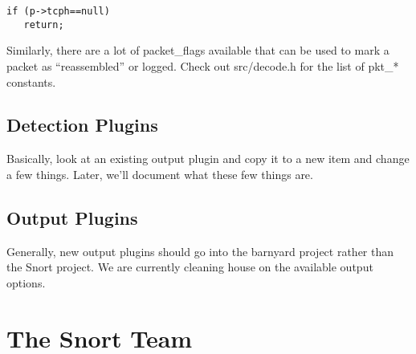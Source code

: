 \documentclass[english]{report}
\begin{document}
\begin{verbatim}
if (p->tcph==null)
   return;
\end{verbatim}

Similarly, there are a lot of packet\_flags available that can be used to mark
a packet as ``reassembled'' or logged. Check out src/decode.h for the list of
pkt\_{*} constants.

\subsection{Detection Plugins}

Basically, look at an existing output plugin and copy it to a new item and
change a few things. Later, we'll document what these few things are.

\subsection{Output Plugins}

Generally, new output plugins should go into the barnyard project rather than
the Snort project. We are currently cleaning house on the available output
options.

\section{The Snort Team}
\end{document}
